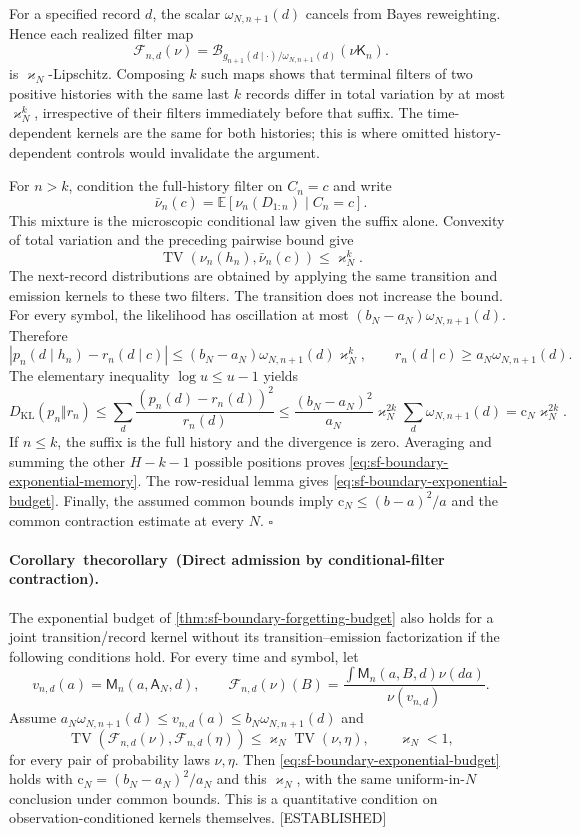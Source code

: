 \documentclass[11pt,letterpaper]{report}
\newcommand{\KL}{D_{\mathrm{KL}}}
\newcounter{statementsequence}[chapter]
\newcommand{\syncstatementcounter}[1]{\stepcounter{statementsequence}\setcounter{#1}{\numexpr\value{statementsequence}-1\relax}\refstepcounter{#1}}
\newcommand{\resultheading}[4]{\syncstatementcounter{#2}\label{#4}\paragraph{#1~\csname the#2\endcsname\ (#3).}}
\newcommand{\corollaryheading}[2]{\resultheading{Corollary}{corollary}{#1}{#2}}
\newcommand{\status}[1]{\mbox{{\small\textsc{\textcolor{red!45!black}{[#1]}}}}}
\begin{document}
For a specified record $d$, the scalar $\omega_{N,n+1}(d)$ cancels from Bayes reweighting. Hence each realized filter map
\[
 \mathscr F_{n,d}(\nu)
 =\mathscr B_{g_{n+1}(d\mid\cdot)/\omega_{N,n+1}(d)}
                         (\nu\mathsf K_n).
\]
is $\varkappa_N$-Lipschitz. Composing $k$ such maps shows that terminal filters of two positive histories with the same last $k$ records differ in total variation by at most $\varkappa_N^k$, irrespective of their filters immediately before that suffix. The time-dependent kernels are the same for both histories; this is where omitted history-dependent controls would invalidate the argument.

For $n>k$, condition the full-history filter on $C_n=c$ and write
\[
 \bar\nu_n(c)=\mathbb E[\nu_n(D_{1:n})\mid C_n=c].
\]
This mixture is the microscopic conditional law given the suffix alone. Convexity of total variation and the preceding pairwise bound give
\[
 \operatorname{TV}(\nu_n(h_n),\bar\nu_n(c))
       \le\varkappa_N^k.
\]
The next-record distributions are obtained by applying the same transition and emission kernels to these two filters. The transition does not increase the bound. For every symbol, the likelihood has oscillation at most $(b_N-a_N)\omega_{N,n+1}(d)$. Therefore
\[
 |p_n(d\mid h_n)-r_n(d\mid c)|
 \le(b_N-a_N)\omega_{N,n+1}(d)\varkappa_N^k,
 \qquad
 r_n(d\mid c)\ge a_N\omega_{N,n+1}(d).
\]
The elementary inequality $\log u\le u-1$ yields
\[
 \KL(p_n\Vert r_n)
 \le\sum_d\frac{(p_n(d)-r_n(d))^2}{r_n(d)}
 \le\frac{(b_N-a_N)^2}{a_N}\varkappa_N^{2k}
           \sum_d\omega_{N,n+1}(d)
 =\mathrm c_N\varkappa_N^{2k}.
\]
If $n\le k$, the suffix is the full history and the divergence is zero. Averaging and summing the other $H-k-1$ possible positions proves \cref{eq:sf-boundary-exponential-memory}. The row-residual lemma gives \cref{eq:sf-boundary-exponential-budget}. Finally, the assumed common bounds imply $\mathrm c_N\le(b-a)^2/a$ and the common contraction estimate at every $N$. $\square$


\corollaryheading{Direct admission by conditional-filter contraction}{cor:sf-boundary-direct-filter}
The exponential budget of \cref{thm:sf-boundary-forgetting-budget} also holds for a joint transition/record kernel without its transition--emission factorization if the following conditions hold. For every time and symbol, let
\[
 v_{n,d}(a)=\mathsf M_n(a,\mathsf A_N,d),
 \qquad
 \mathscr F_{n,d}(\nu)(B)
 =\frac{\int\mathsf M_n(a,B,d)\nu(da)}{\nu(v_{n,d})}.
\]
Assume $a_N\omega_{N,n+1}(d)\le v_{n,d}(a)\le b_N\omega_{N,n+1}(d)$ and
\[
 \operatorname{TV}(\mathscr F_{n,d}(\nu),\mathscr F_{n,d}(\eta))
 \le\varkappa_N\operatorname{TV}(\nu,\eta),
 \qquad \varkappa_N<1,
\]
for every pair of probability laws $\nu,\eta$. Then \cref{eq:sf-boundary-exponential-budget} holds with $\mathrm c_N=(b_N-a_N)^2/a_N$ and this $\varkappa_N$, with the same uniform-in-$N$ conclusion under common bounds. This is a quantitative condition on observation-conditioned kernels themselves. \status{ESTABLISHED}
\end{document}

